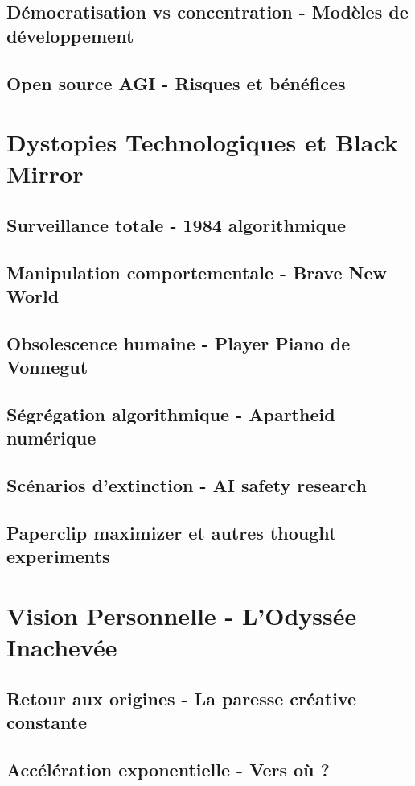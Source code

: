 \documentclass[12pt,a4paper]{book}
\begin{document}
\section{Démocratisation vs concentration - Modèles de développement}
\section{Open source AGI - Risques et bénéfices}

\chapter{Dystopies Technologiques et Black Mirror}
\section{Surveillance totale - 1984 algorithmique}
\section{Manipulation comportementale - Brave New World}
\section{Obsolescence humaine - Player Piano de Vonnegut}
\section{Ségrégation algorithmique - Apartheid numérique}
\section{Scénarios d'extinction - AI safety research}
\section{Paperclip maximizer et autres thought experiments}

\chapter{Vision Personnelle - L'Odyssée Inachevée}
\section{Retour aux origines - La paresse créative constante}
\section{Accélération exponentielle - Vers où ?}
\end{document}
